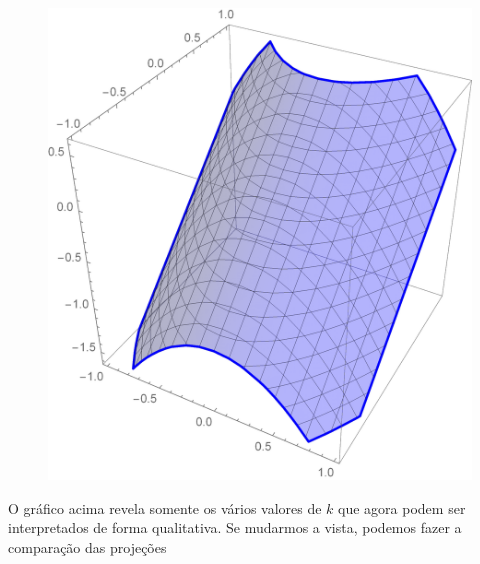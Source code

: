 \documentclass[a4paper, 12pt]{article}
\begin{document}
	\begin{figure}[!h]
		\centering
		\includegraphics[scale=.3]{images/ContourPlot3d}
	\end{figure}

	O gráfico acima revela somente os vários valores de $k$ que agora podem ser interpretados de forma qualitativa. Se mudarmos a vista, podemos fazer a comparação das projeções\\
	
\end{document}
